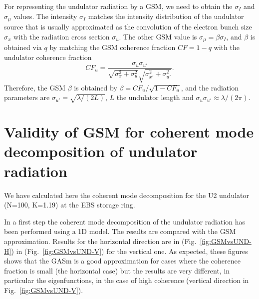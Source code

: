 \documentclass{iucr}              %
\begin{document}
For representing the undulator radiation by a GSM, we need to obtain the $\sigma_I$ and $\sigma_\mu$ values. The intensity $\sigma_I$ matches the intensity distribution of the undulator source that is usually approximated as the convolution of the electron bunch size $\sigma_x$ with the radiation cross section $\sigma_u$. The other GSM value is $\sigma_\mu=\beta\sigma_I$, and $\beta$ is obtained via $q$ by matching the GSM coherence fraction $CF=1-q$ with the undulator coherence fraction
\begin{equation}
    CF_u = \frac{\sigma_u\sigma_{u'}}{\sqrt{\sigma_x^2+\sigma_u^2}\sqrt{\sigma_{x'}^2+\sigma_{u'}^2}}.
\end{equation}
Therefore, the GSM $\beta$ is obtained by $\beta=CF_u/\sqrt{1-CF_u}$,
and the radiation parameters are $\sigma_{u'}=\sqrt{\lambda/(2L)}$, $L$ the undulator length and $\sigma_u \sigma_{u'} \approx \lambda / (2 \pi)$.




\section{Validity of GSM for coherent mode decomposition of undulator radiation}
\label{sec:appendixB}

We have calculated here the coherent mode decomposition for the U2 undulator (N=100, K=1.19) at the EBS storage ring. 

In a first step the coherent mode decomposition of the undulator radiation has been performed using a 1D model. The results are compared with the GSM approximation. Results for the horizontal direction are in (Fig.~\ref{fig:GSMvsUND-H}) in (Fig.~\ref{fig:GSMvsUND-V}) for the vertical one. As expected, these figures shows that the GASm is a good approximation for cases where the coherence fraction is small (the horizontal case) but the results are very different, in particular the eigenfunctions, in the case of high coherence (vertical direction in Fig.~\ref{fig:GSMvsUND-V}).
\end{document}
